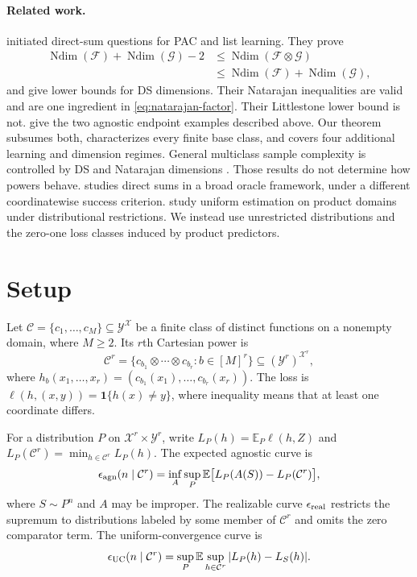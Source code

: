 \documentclass[twoside]{article}
\newcommand{\E}{\mathbb E}
\newcommand{\C}{\mathcal C}
\newcommand{\Ndim}{\operatorname{Ndim}}
\begin{document}
\paragraph{Related work.} \citet{hanneke2024list,hanneke2024open} initiated direct-sum questions for PAC and list learning. They prove
\begin{align*}
 \Ndim(\mathcal F)+\Ndim(\mathcal G)-2
 &\leq \Ndim(\mathcal F\otimes\mathcal G)\\
 &\leq \Ndim(\mathcal F)+\Ndim(\mathcal G),
\end{align*}
and give lower bounds for DS dimensions. Their Natarajan inequalities are valid and are one ingredient in \eqref{eq:natarajan-factor}. Their Littlestone lower bound is not. \citet{more2026} give the two agnostic endpoint examples described above. Our theorem subsumes both, characterizes every finite base class, and covers four additional learning and dimension regimes. General multiclass sample complexity is controlled by DS and Natarajan dimensions \citep{brukhim2022,cohen2025,pabbaraju2026}. Those results do not determine how powers behave. \citet{suruga2024} studies direct sums in a broad oracle framework, under a different coordinatewise success criterion. \citet{holzman2026} study uniform estimation on product domains under distributional restrictions. We instead use unrestricted distributions and the zero-one loss classes induced by product predictors.

\section{Setup}
\label{sec:setup}

Let $\C=\{c_1,\ldots,c_M\}\subseteq\mathcal Y^{\mathcal X}$ be a finite class of distinct functions on a nonempty domain, where $M\geq2$. Its $r$th Cartesian power is
\[
 \C^r=\{c_{b_1}\otimes\cdots\otimes c_{b_r}:b\in[M]^r\}\subseteq(\mathcal Y^r)^{\mathcal X^r},
\]
where $h_b(x_1,\ldots,x_r)=(c_{b_1}(x_1),\ldots,c_{b_r}(x_r))$. The loss is $\ell(h,(x,y))=\mathbf1\{h(x)\neq y\}$, where inequality means that at least one coordinate differs.

For a distribution $P$ on $\mathcal X^r\times\mathcal Y^r$, write $L_P(h)=\E_P\ell(h,Z)$ and $L_P(\C^r)=\min_{h\in\C^r}L_P(h)$. The expected agnostic curve is
\[
 \epsilon_{\rm agn}(n\mid\C^r)=\inf_A\sup_P \E\bigl[L_P(A(S))-L_P(\C^r)\bigr],
\]
where $S\sim P^n$ and $A$ may be improper. The realizable curve $\epsilon_{\rm real}$ restricts the supremum to distributions labeled by some member of $\C^r$ and omits the zero comparator term. The uniform-convergence curve is
\[
 \epsilon_{\rm UC}(n\mid\C^r)=\sup_P\E\sup_{h\in\C^r}|L_P(h)-L_S(h)|.
\]
\end{document}

